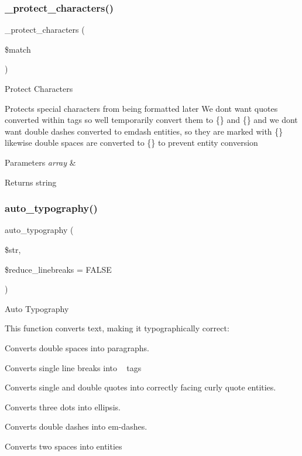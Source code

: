 \subsubsection{\texorpdfstring{\+\_\+protect\+\_\+characters()}{\_protect\_characters()}}
{\footnotesize\ttfamily \+\_\+protect\+\_\+characters (\begin{DoxyParamCaption}\item[{}]{\$match }\end{DoxyParamCaption})\hspace{0.3cm}{\ttfamily [protected]}}

Protect Characters

Protects special characters from being formatted later We don\textquotesingle{}t want quotes converted within tags so we\textquotesingle{}ll temporarily convert them to \{\} and \{\} and we don\textquotesingle{}t want double dashes converted to emdash entities, so they are marked with \{\} likewise double spaces are converted to \{\} to prevent entity conversion


\begin{DoxyParams}{Parameters}
{\em array} & \\
\hline
\end{DoxyParams}
\begin{DoxyReturn}{Returns}
string 
\end{DoxyReturn}
\mbox{\label{class_c_i___typography_a24c284b560f34d6c7fad07e36baaa024}} 
\subsubsection{\texorpdfstring{auto\+\_\+typography()}{auto\_typography()}}
{\footnotesize\ttfamily auto\+\_\+typography (\begin{DoxyParamCaption}\item[{}]{\$str,  }\item[{}]{\$reduce\+\_\+linebreaks = {\ttfamily FALSE} }\end{DoxyParamCaption})}

Auto Typography

This function converts text, making it typographically correct\+:
\begin{DoxyItemize}
\item Converts double spaces into paragraphs.
\item Converts single line breaks into ~\newline
 tags
\item Converts single and double quotes into correctly facing curly quote entities.
\item Converts three dots into ellipsis.
\item Converts double dashes into em-\/dashes.
\item Converts two spaces into entities
\end{DoxyItemize}


